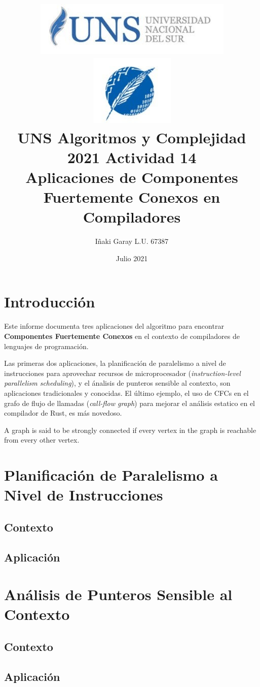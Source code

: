 \documentclass[12pt, a4paper]{article}
\title{
    \includegraphics[height=0.2\textwidth]{uns-logo}
    \includegraphics[height=0.2\textwidth]{dcic-logo} \\
    UNS Algoritmos y Complejidad 2021 Actividad 14 \\
    \large{Aplicaciones de Componentes Fuertemente Conexos en Compiladores}
    }
\author{Iñaki Garay L.U. 67387}
\date{Julio 2021}
\begin{document}
\maketitle


\section{Introducción}
Este informe documenta tres aplicaciones del algoritmo para encontrar \textbf{Componentes Fuertemente Conexos} en el contexto de compiladores de lenguajes de programación.

Las primeras dos aplicaciones, la planificación de paralelismo a nivel de instrucciones para aprovechar recursos de microprocesador (\textit{instruction-level parallelism scheduling}), y el ánalisis de punteros sensible al contexto, son aplicaciones tradicionales y conocidas. 
El último ejemplo, el uso de CFCs en el grafo de flujo de llamadas (\textit{call-flow graph}) para mejorar el análisis estatico en el compilador de Rust, es más novedoso.

A graph is said to be strongly connected if every vertex in the graph is reachable from every other vertex.

\section{Planificación de Paralelismo a Nivel de Instrucciones}

\subsection{Contexto}

\subsection{Aplicación}

\section{Análisis de Punteros Sensible al Contexto}

\subsection{Contexto}

\subsection{Aplicación}
\end{document}
